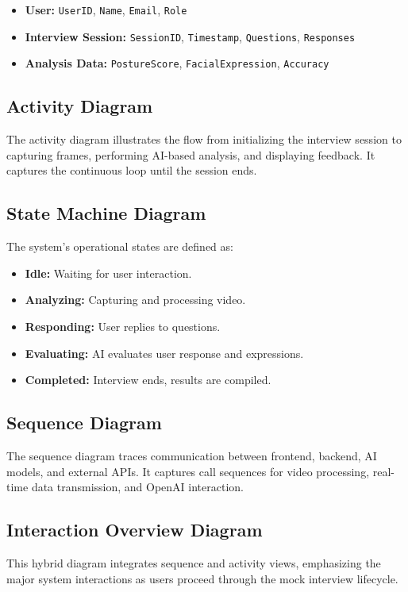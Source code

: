 \begin{itemize}
  \item \textbf{User:} \texttt{UserID}, \texttt{Name}, \texttt{Email}, \texttt{Role}
  \item \textbf{Interview Session:} \texttt{SessionID}, \texttt{Timestamp}, \texttt{Questions}, \texttt{Responses}
  \item \textbf{Analysis Data:} \texttt{PostureScore}, \texttt{FacialExpression}, \texttt{Accuracy}
\end{itemize}

\subsection{Activity Diagram}
The activity diagram illustrates the flow from initializing the interview session to capturing frames, performing AI-based analysis, and displaying feedback. It captures the continuous loop until the session ends.

\subsection{State Machine Diagram}
The system’s operational states are defined as:

\begin{itemize}
  \item \textbf{Idle:} Waiting for user interaction.
  \item \textbf{Analyzing:} Capturing and processing video.
  \item \textbf{Responding:} User replies to questions.
  \item \textbf{Evaluating:} AI evaluates user response and expressions.
  \item \textbf{Completed:} Interview ends, results are compiled.
\end{itemize}

\subsection{Sequence Diagram}
The sequence diagram traces communication between frontend, backend, AI models, and external APIs. It captures call sequences for video processing, real-time data transmission, and OpenAI interaction.

\subsection{Interaction Overview Diagram}
This hybrid diagram integrates sequence and activity views, emphasizing the major system interactions as users proceed through the mock interview lifecycle.

